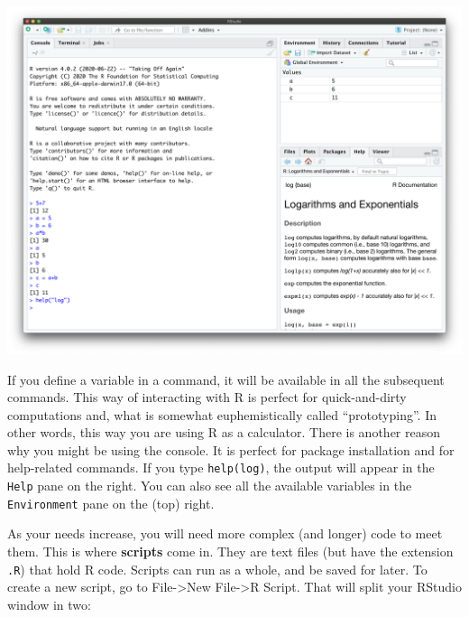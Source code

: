 \documentclass[
]{book}
\theoremstyle{definition}
\theoremstyle{definition}
\theoremstyle{definition}
\theoremstyle{definition}
\theoremstyle{remark}
\begin{document}
\begin{center}\includegraphics[width=1\linewidth,style="padding:10px"]{pics/console_session} \end{center}

If you define a variable in a command, it will be available in all the subsequent commands. This way of interacting with R is perfect for quick-and-dirty computations and, what is somewhat euphemistically called ``prototyping''. In other words, this way you are using R as a calculator. There is another reason why you might be using the console. It is perfect for package installation and for help-related commands. If you type \texttt{help(\textquotesingle{}log\textquotesingle{})}, the output will appear in the \texttt{Help} pane on the right. You can also see all the available variables in the \texttt{Environment} pane on the (top) right.

As your needs increase, you will need more complex (and longer) code to meet them. This is where \textbf{scripts} come in. They are text files (but have the extension \texttt{.R}) that hold R code. Scripts can run as a whole, and be saved for later. To create a new script, go to File-\textgreater New File-\textgreater R Script. That will split your RStudio window in two:
\end{document}
